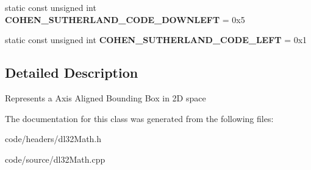 \begin{DoxyCompactItemize}
\item 
\hypertarget{classdl32_a_a_b_b2_d_acfcae94ef9c787b5e17ef500536dcf9d}{static const unsigned int {\bfseries C\-O\-H\-E\-N\-\_\-\-S\-U\-T\-H\-E\-R\-L\-A\-N\-D\-\_\-\-C\-O\-D\-E\-\_\-\-D\-O\-W\-N\-L\-E\-F\-T} = 0x5}\label{classdl32_a_a_b_b2_d_acfcae94ef9c787b5e17ef500536dcf9d}

\item 
\hypertarget{classdl32_a_a_b_b2_d_aa20af89bff6773469883e32228048a28}{static const unsigned int {\bfseries C\-O\-H\-E\-N\-\_\-\-S\-U\-T\-H\-E\-R\-L\-A\-N\-D\-\_\-\-C\-O\-D\-E\-\_\-\-L\-E\-F\-T} = 0x1}\label{classdl32_a_a_b_b2_d_aa20af89bff6773469883e32228048a28}

\end{DoxyCompactItemize}


\subsection{Detailed Description}
Represents a Axis Aligned Bounding Box in 2\-D space 

The documentation for this class was generated from the following files\-:\begin{DoxyCompactItemize}
\item 
code/headers/dl32\-Math.\-h\item 
code/source/dl32\-Math.\-cpp\end{DoxyCompactItemize}

